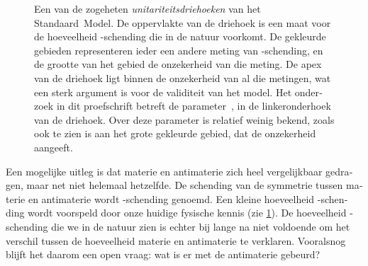 \begin{otherlanguage}{dutch}
\begin{figure}[htb]
    \caption{
        Een van de zogeheten \emph{unitariteitsdriehoeken} van het Standaard~Model.
        De oppervlakte van de driehoek is een maat voor de hoeveelheid \CP-schending die in de natuur voorkomt.
        De gekleurde gebieden representeren ieder een andere meting van \CP-schending, en de grootte van het gebied de onzekerheid van die meting.
        De apex van de driehoek ligt binnen de onzekerheid van al die metingen, wat een sterk argument is voor de validiteit van het model.
        Het onderzoek in dit proefschrift betreft de parameter~\CPgamma, in de linkeronderhoek van de driehoek.
        Over deze parameter is relatief weinig bekend, zoals ook te zien is aan het grote gekleurde gebied, dat de onzekerheid aangeeft.}
    \label{fig:samenvatting_UT}
\end{figure}
%
Een mogelijke uitleg is dat materie en antimaterie zich heel vergelijkbaar gedragen, maar net niet helemaal hetzelfde.
De schending van de symmetrie tussen materie en antimaterie wordt \CP-schending genoemd.
Een kleine hoeveelheid \CP-schending wordt voorspeld door onze huidige fysische kennis (zie \cref{fig:samenvatting_UT}).
De hoeveelheid \CP-schending die we in de natuur zien is echter bij lange na niet voldoende om het verschil tussen de hoeveelheid materie en antimaterie te verklaren.
Vooralsnog blijft het daarom een open vraag: wat is er met de antimaterie gebeurd?

\begin{figure}[htb] \centerfloat
    \hspace*{-.5cm}
\end{figure}
\end{otherlanguage}
